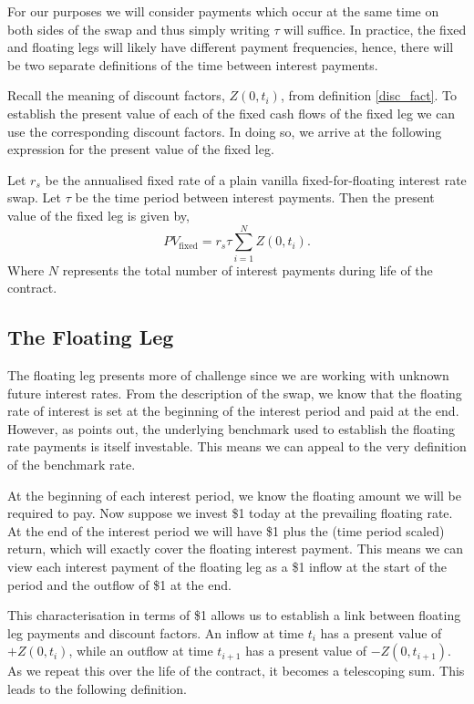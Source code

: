 For our purposes we will consider payments which occur at the same time on both sides of the swap and thus simply writing $\tau$ will suffice. In practice, the fixed and floating legs will likely have different payment frequencies, hence, there will be two separate definitions of the time between interest payments. 

Recall the meaning of discount factors, $Z(0,t_i)$, from definition \ref{disc_fact}. To establish the present value of each of the fixed cash flows of the fixed leg we can use the corresponding discount factors. In doing so, we arrive at the following expression for the present value of the fixed leg.

\begin{definition}
\label{pv_fixed}
    Let $r_s$ be the annualised fixed rate of a plain vanilla fixed-for-floating interest rate swap. Let $\tau$ be the time period between interest payments. Then the present value of the fixed leg is given by,
    \begin{equation}
        PV_{\text{fixed}} = r_s \tau \sum_{i=1}^{N} Z(0,t_i). 
    \end{equation}
    Where $N$ represents the total number of interest payments during life of the contract. 
\end{definition}

\subsection{The Floating Leg}
The floating leg presents more of challenge since we are working with unknown future interest rates. From the description of the swap, we know that the floating rate of interest is set at the beginning of the interest period and paid at the end. However, as \cite{wilmott2013paul} points out, the underlying benchmark used to establish the floating rate payments is itself investable. This means we can appeal to the very definition of the benchmark rate. 

At the beginning of each interest period, we know the floating amount we will be required to pay. Now suppose we invest \$1 today at the prevailing floating rate. At the end of the interest period we will have \$1 plus the (time period scaled) return, which will exactly cover the floating interest payment. This means we can view each interest payment of the floating leg as a \$1 inflow at the start of the period and the outflow of \$1 at the end. 

This characterisation in terms of \$1 allows us to establish a link between floating leg payments and discount factors. An inflow at time $t_i$ has a present value of $+Z(0,t_i)$, while an outflow at time $t_{i+1}$ has a present value of $-Z(0,t_{i+1})$. As we repeat this over the life of the contract, it becomes a telescoping sum. This leads to the following definition. 

